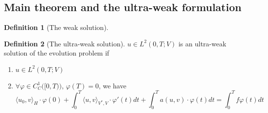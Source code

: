 \documentclass[a4paper,12pt,oneside,fleqn]{book}
\theoremstyle{definition}
\newtheorem{definition}{Definition}[section]
\theoremstyle{remark}
\begin{document}
\subsection{Main theorem and the ultra-weak formulation}
\begin{definition}[The weak solution]
	
\end{definition}
\begin{definition}[The ultra-weak solution]
$u \in L^2(0, T; V)$ is an ultra-weak solution of the evolution problem if
\begin{enumerate}
	\item $u \in L^2(0, T; V)$
	\item $\forall \varphi \in C^1_C\bigg([0, T)\bigg)$, $\varphi(T) = 0$, we have
	\begin{equation}
		\langle u_0, v \rangle_H \cdot  \varphi(0) + \int_0^T \langle u, v \rangle_{V^*, V} \cdot  \varphi'(t) dt + \int_0^T a(u, v ) \cdot  \varphi(t) dt = \int_0^T f \varphi(t) dt
	\end{equation}
\end{enumerate}
\end{definition}
\end{document}
